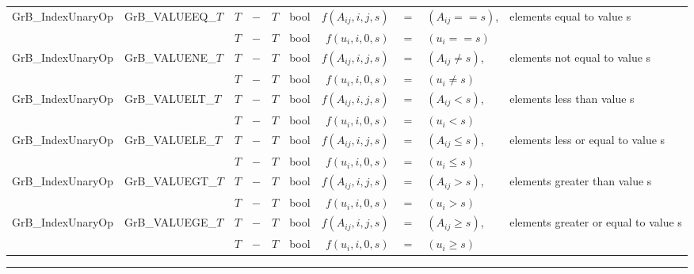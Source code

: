 \begin{landscape}
\begin{table}
\begin{threeparttable}
\begin{tabular}{l|l|cccc|rcll}
{\sf GrB\_IndexUnaryOp}   & {\sf GrB\_VALUEEQ\_$T$} & $T$ & $-$ & $T$ & {\sf bool} & $f(A_{ij},i,j,s)$ & $=$ & $(A_{ij} ==   s)$, & elements equal to value s \\
                          &                         & $T$ & $-$ & $T$ & {\sf bool} & $f(u_{i}, i,0,s)$ & $=$ & $(u_{i}  ==   s)$ \\
{\sf GrB\_IndexUnaryOp}   & {\sf GrB\_VALUENE\_$T$} & $T$ & $-$ & $T$ & {\sf bool} & $f(A_{ij},i,j,s)$ & $=$ & $(A_{ij} \neq s)$, & elements not equal to value s \\
                          &                         & $T$ & $-$ & $T$ & {\sf bool} & $f(u_{i}, i,0,s)$ & $=$ & $(u_{i}  \neq s)$ \\
{\sf GrB\_IndexUnaryOp}   & {\sf GrB\_VALUELT\_$T$} & $T$ & $-$ & $T$ & {\sf bool} & $f(A_{ij},i,j,s)$ & $=$ & $(A_{ij} <    s)$, & elements less than value s \\
                          &                         & $T$ & $-$ & $T$ & {\sf bool} & $f(u_{i}, i,0,s)$ & $=$ & $(u_{i}  <    s)$ \\
{\sf GrB\_IndexUnaryOp}   & {\sf GrB\_VALUELE\_$T$} & $T$ & $-$ & $T$ & {\sf bool} & $f(A_{ij},i,j,s)$ & $=$ & $(A_{ij} \leq s)$, & elements less or equal to value s \\
                          &                         & $T$ & $-$ & $T$ & {\sf bool} & $f(u_{i}, i,0,s)$ & $=$ & $(u_{i}  \leq s)$ \\
{\sf GrB\_IndexUnaryOp}   & {\sf GrB\_VALUEGT\_$T$} & $T$ & $-$ & $T$ & {\sf bool} & $f(A_{ij},i,j,s)$ & $=$ & $(A_{ij} >    s)$, & elements greater than value s \\
                          &                         & $T$ & $-$ & $T$ & {\sf bool} & $f(u_{i}, i,0,s)$ & $=$ & $(u_{i}  >    s)$ \\
{\sf GrB\_IndexUnaryOp}   & {\sf GrB\_VALUEGE\_$T$} & $T$ & $-$ & $T$ & {\sf bool} & $f(A_{ij},i,j,s)$ & $=$ & $(A_{ij} \geq s)$, & elements greater or equal to value s \\
                          &                         & $T$ & $-$ & $T$ & {\sf bool} & $f(u_{i}, i,0,s)$ & $=$ & $(u_{i}  \geq s)$ \\
\end{tabular}
\hrule
\end{threeparttable}
\end{table}


\end{landscape}

